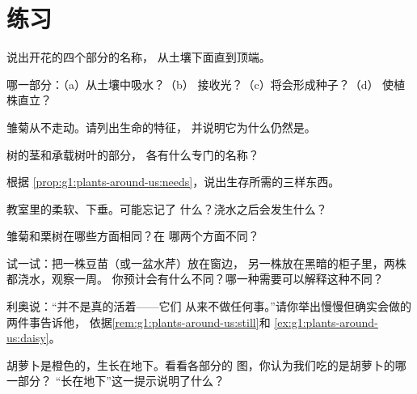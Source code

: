 \section{练习}

\begin{exercise}[$\star$]\label{exo:g1:plants-around-us:1}
说出开花的四个部分的名称，
从土壤下面直到顶端。
\end{exercise}

\begin{exercise}[$\star$]\label{exo:g1:plants-around-us:2}
哪一部分：（a）从土壤中吸水？（b）
接收光？（c）将会形成种子？（d）
使植株直立？
\end{exercise}

\begin{exercise}[$\star$]\label{exo:g1:plants-around-us:3}
雏菊从不走动。请列出生命的特征，
并说明它为什么仍然是。
\end{exercise}

\begin{exercise}[$\star$]\label{exo:g1:plants-around-us:4}
树的茎和承载树叶的部分，
各有什么专门的名称？
\end{exercise}

\begin{exercise}[$\star$]\label{exo:g1:plants-around-us:5}
根据
\cref{prop:g1:plants-around-us:needs}，说出生存所需的三样东西。
\end{exercise}

\begin{exercise}[$\star$]\label{exo:g1:plants-around-us:6}
教室里的柔软、下垂。可能忘记了
什么？浇水之后会发生什么？
\end{exercise}

\begin{exercise}[$\star$]\label{exo:g1:plants-around-us:7}
雏菊和栗树在哪些方面相同？在
哪两个方面不同？
\end{exercise}

\begin{exercise}[$\star$]\label{exo:g1:plants-around-us:8}
试一试：把一株豆苗（或一盆水芹）放在窗边，
另一株放在黑暗的柜子里，两株都浇水，观察一周。
你预计会有什么不同？哪一种需要可以解释这种不同？
\end{exercise}

\begin{exercise}[$\star\star$]\label{exo:g1:plants-around-us:9}
利奥说：“并不是真的活着——它们
从来不做任何事。”请你举出慢慢但确实会做的两件事告诉他，
依据\cref{rem:g1:plants-around-us:still}和
\cref{ex:g1:plants-around-us:daisy}。
\end{exercise}

\begin{exercise}[$\star\star$]\label{exo:g1:plants-around-us:10}
胡萝卜是橙色的，生长在地下。看看各部分的
图，你认为我们吃的是胡萝卜的哪一部分？
“长在地下”这一提示说明了什么？
\end{exercise}
